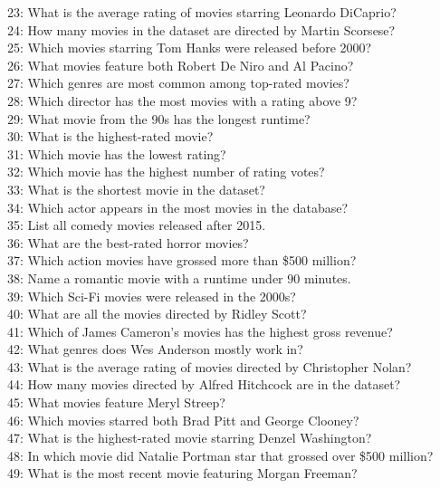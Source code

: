 \documentclass[
a4paper,
12pt,
]{article}
\begin{document}
\begin{appendices}
23: What is the average rating of movies starring Leonardo DiCaprio?\\
24: How many movies in the dataset are directed by Martin Scorsese?\\
25: Which movies starring Tom Hanks were released before 2000?\\
26: What movies feature both Robert De Niro and Al Pacino?\\
27: Which genres are most common among top-rated movies?\\
28: Which director has the most movies with a rating above 9?\\
29: What movie from the 90s has the longest runtime?\\
30: What is the highest-rated movie?\\
31: Which movie has the lowest rating?\\
32: Which movie has the highest number of rating votes?\\
33: What is the shortest movie in the dataset?\\
34: Which actor appears in the most movies in the database?\\
35: List all comedy movies released after 2015.\\
36: What are the best-rated horror movies?\\
37: Which action movies have grossed more than \$500 million?\\
38: Name a romantic movie with a runtime under 90 minutes.\\
39: Which Sci-Fi movies were released in the 2000s?\\
40: What are all the movies directed by Ridley Scott?\\
41: Which of James Cameron’s movies has the highest gross revenue?\\
42: What genres does Wes Anderson mostly work in?\\
43: What is the average rating of movies directed by Christopher Nolan?\\
44: How many movies directed by Alfred Hitchcock are in the dataset?\\
45: What movies feature Meryl Streep?\\
46: Which movies starred both Brad Pitt and George Clooney?\\
47: What is the highest-rated movie starring Denzel Washington?\\
48: In which movie did Natalie Portman star that grossed over \$500 million?\\
49: What is the most recent movie featuring Morgan Freeman?\\

\end{appendices}
\end{document}
